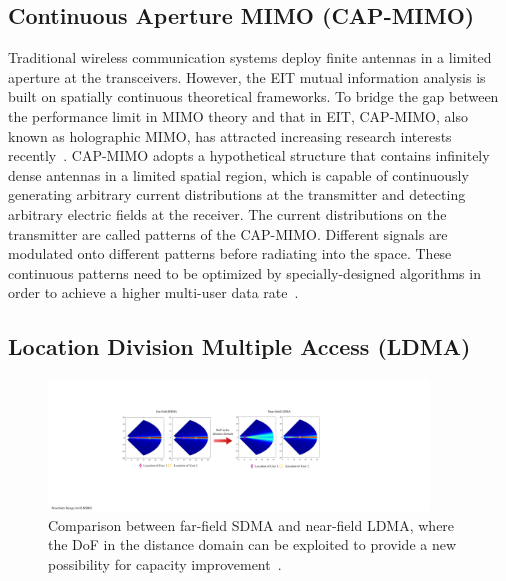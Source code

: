 \documentclass[journal,twocolumn]{IEEEtran}
\begin{document}
\subsection{Continuous Aperture MIMO (CAP-MIMO)}
Traditional wireless communication systems deploy finite antennas in a limited aperture at the transceivers. 
However, the EIT mutual information analysis is built on spatially continuous theoretical frameworks. 
To bridge the gap between the performance limit in MIMO theory and that in EIT, CAP-MIMO, also known as holographic MIMO, has attracted increasing research interests recently~\cite{zhang2022pdma}. 
CAP-MIMO adopts a hypothetical structure that contains infinitely dense antennas in a limited spatial region, which is capable of continuously generating arbitrary current distributions at the transmitter and detecting arbitrary electric fields at the receiver.  
The current distributions on the transmitter are called patterns of the CAP-MIMO. 
Different signals are modulated onto different patterns before radiating into the space. 
These continuous patterns need to be optimized by specially-designed algorithms in order to achieve a higher multi-user data rate~\cite{zhang2022pdma}. 



\subsection{Location Division Multiple Access (LDMA)}
\begin{figure}[t]
	\centering 
	\includegraphics[width=0.9\textwidth]{figures/LDMA.pdf} 
	\caption{Comparison between far-field SDMA and near-field LDMA, where the DoF in the distance domain can be exploited to provide a new possibility for capacity improvement~\cite{wu2022multiple}. }
	\label{fig:LDMA}
\end{figure}
\end{document}
